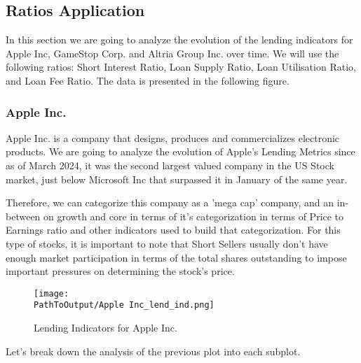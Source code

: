 \subsection{Ratios Application}

In this section we are going to analyze the evolution of the lending indicators for Apple Inc, GameStop Corp. and Altria Group Inc. over time. We will use the following ratios: Short Interest Ratio, Loan Supply Ratio, Loan Utilisation Ratio, and Loan Fee Ratio. The data is presented in the following figure.

\subsubsection{Apple Inc.}

Apple Inc. is a company that designs, produces and commercializes electronic products. We are going to analyze the evolution of Apple's Lending Metrics since as of March 2024, it was the second largest valued company in the US Stock market, just below Microsoft Inc that surpassed it in January of the same year.

Therefore, we can categorize this company as a 'mega cap' company, and an in-between on growth and core in terms of it's categorization in terms of Price to Earnings ratio and other indicators used to build that categorization. For this type of stocks, it is important to note that Short Sellers usually don't have enough market participation in terms of the total shares outstanding to impose important pressures on determining the stock's price.

\begin{figure}[H]
\centering
\caption{Lending Indicators for Apple Inc.}
  \centering
  \texttt{[image: \\PathToOutput/Apple Inc\_lend\_ind.png]}
\label{fig:apple_lending_indicators}
\end{figure}

Let's break down the analysis of the previous plot into each subplot.

